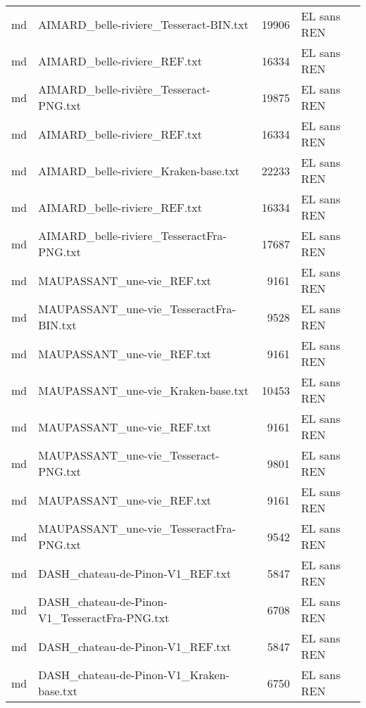\begin{tabular}{llrl}
    md &             AIMARD\_belle-riviere\_Tesseract-BIN.txt &                 19906 & EL sans REN \\
    md &                       AIMARD\_belle-riviere\_REF.txt &                 16334 & EL sans REN \\
    md &             AIMARD\_belle-rivière\_Tesseract-PNG.txt &                 19875 & EL sans REN \\
    md &                       AIMARD\_belle-riviere\_REF.txt &                 16334 & EL sans REN \\
    md &               AIMARD\_belle-riviere\_Kraken-base.txt &                 22233 & EL sans REN \\
    md &                       AIMARD\_belle-riviere\_REF.txt &                 16334 & EL sans REN \\
    md &          AIMARD\_belle-riviere\_TesseractFra-PNG.txt &                 17687 & EL sans REN \\
    md &                         MAUPASSANT\_une-vie\_REF.txt &                  9161 & EL sans REN \\
    md &            MAUPASSANT\_une-vie\_TesseractFra-BIN.txt &                  9528 & EL sans REN \\
    md &                         MAUPASSANT\_une-vie\_REF.txt &                  9161 & EL sans REN \\
    md &                 MAUPASSANT\_une-vie\_Kraken-base.txt &                 10453 & EL sans REN \\
    md &                         MAUPASSANT\_une-vie\_REF.txt &                  9161 & EL sans REN \\
    md &               MAUPASSANT\_une-vie\_Tesseract-PNG.txt &                  9801 & EL sans REN \\
    md &                         MAUPASSANT\_une-vie\_REF.txt &                  9161 & EL sans REN \\
    md &            MAUPASSANT\_une-vie\_TesseractFra-PNG.txt &                  9542 & EL sans REN \\
    md &                   DASH\_chateau-de-Pinon-V1\_REF.txt &                  5847 & EL sans REN \\
    md &      DASH\_chateau-de-Pinon-V1\_TesseractFra-PNG.txt &                  6708 & EL sans REN \\
    md &                   DASH\_chateau-de-Pinon-V1\_REF.txt &                  5847 & EL sans REN \\
    md &           DASH\_chateau-de-Pinon-V1\_Kraken-base.txt &                  6750 & EL sans REN \\

\end{tabular}
